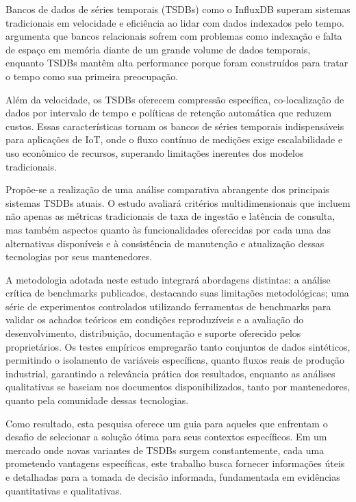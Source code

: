 Bancos de dados de séries temporais (TSDBs) como o InfluxDB superam sistemas tradicionais em velocidade e eficiência ao lidar com dados indexados pelo tempo.  argumenta que bancos relacionais sofrem com problemas como indexação e falta de espaço em memória diante de um grande volume de dados temporais, enquanto TSDBs mantêm alta performance porque foram construídos para tratar o tempo como sua primeira preocupação.

Além da velocidade, os TSDBs oferecem compressão específica, co-localização de dados por intervalo de tempo e políticas de retenção automática que reduzem custos. Essas características tornam os bancos de séries temporais indispensáveis para aplicações de IoT, onde o fluxo contínuo de medições exige escalabilidade e uso econômico de recursos, superando limitações inerentes dos modelos tradicionais.

Propõe-se a realização de uma análise comparativa abrangente dos principais sistemas TSDBs atuais. O estudo avaliará critérios multidimensionais que incluem não apenas as métricas tradicionais de taxa de ingestão e latência de consulta, mas também aspectos quanto às funcionalidades oferecidas por cada uma das alternativas disponíveis e à consistência de manutenção e atualização dessas tecnologias por seus mantenedores.

A metodologia adotada neste estudo integrará abordagens distintas: a análise crítica de benchmarks publicados, destacando suas limitações metodológicas; uma série de experimentos controlados utilizando ferramentas de benchmarks para validar os achados teóricos em condições reproduzíveis e a avaliação do desenvolvimento, distribuição, documentação e suporte oferecido pelos proprietários. Os testes empíricos empregarão tanto conjuntos de dados sintéticos, permitindo o isolamento de variáveis específicas, quanto fluxos reais de produção industrial, garantindo a relevância prática dos resultados, enquanto as análises qualitativas se baseiam nos documentos disponibilizados, tanto por mantenedores, quanto pela comunidade dessas tecnologias.

Como resultado, esta pesquisa oferece um guia para aqueles que enfrentam o desafio de selecionar a solução ótima para seus contextos específicos. Em um mercado onde novas variantes de TSDBs surgem constantemente, cada uma prometendo vantagens específicas, este trabalho busca fornecer informações úteis e detalhadas para a tomada de decisão informada, fundamentada em evidências quantitativas e qualitativas.

